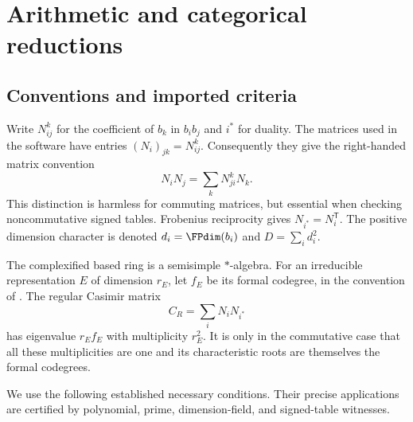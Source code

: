 \section{Arithmetic and categorical reductions}\label{sec:reductions}
\subsection{Conventions and imported criteria}\label{sec:inputs}
Write $N_{ij}^{k}$ for the coefficient of $b_k$ in $b_i b_j$ and $i^*$
for duality. The matrices used in the software have entries
$(N_i)_{jk}=N_{ij}^{k}$. Consequently they give the right-handed matrix
convention
\[
N_iN_j=\sum_k N_{ji}^{k}N_k.
\]
This distinction is harmless for commuting matrices, but essential when
checking noncommutative signed tables. Frobenius reciprocity gives
$N_{i^*}=N_i^{\mathsf T}$.
The positive dimension character is denoted $d_i=\FPdim(b_i)$ and
$D=\sum_i d_i^2$.

The complexified based ring is a semisimple $*$-algebra. For an
irreducible representation $E$ of dimension $r_E$, let $f_E$ be its
formal codegree, in the convention of \cite{Ocode}. The regular
Casimir matrix
\[
C_R=\sum_i N_iN_{i^*}
\]
has eigenvalue $r_Ef_E$ with multiplicity $r_E^2$. It is only in the
commutative case that all these multiplicities are one and its
characteristic roots are themselves the formal codegrees.

We use the following established necessary conditions. Their precise
applications are certified by polynomial, prime, dimension-field, and
signed-table witnesses.

